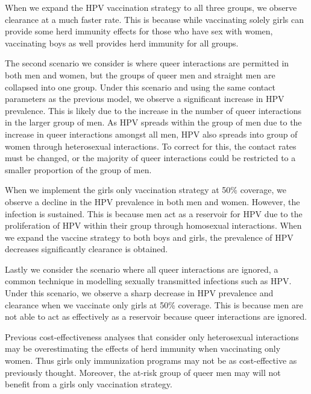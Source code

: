 \documentclass[12pt]{article}
\begin{document}
When we expand the HPV vaccination strategy to all three groups, we observe clearance at a much faster rate.  This is because while vaccinating solely girls can provide some herd immunity effects for those who have sex with women, vaccinating boys as well provides herd immunity for all groups.  

The second scenario we consider is where queer interactions are permitted in both men and women, but the groups of queer men and straight men are collapsed into one group.  Under this scenario and using the same contact parameters as the previous model, we observe a significant increase in HPV prevalence.  This is likely due to the increase in the number of queer interactions in the larger group of men.  As HPV spreads within the group of men due to the increase in queer interactions amongst all men, HPV also spreads into group of women through heterosexual interactions.  To correct for this, the contact rates must be changed, or the majority of queer interactions could be restricted to a smaller proportion of the group of men. 

When we implement the girls only vaccination strategy at 50\% coverage, we observe a decline in the HPV prevalence in both men and women.  However, the infection is sustained.  This is because men act as a reservoir for HPV due to the proliferation of HPV within their group through homosexual interactions.  When we expand the vaccine strategy to both boys and girls, the prevalence of HPV decreases significantly clearance is obtained. 

Lastly we consider the scenario where all queer interactions are ignored, a common technique in modelling sexually transmitted infections such as HPV.  Under this scenario, we observe a sharp decrease in HPV prevalence and clearance when we vaccinate only girls at 50\% coverage.  This is because men are not able to act as effectively as a reservoir because queer interactions are ignored.  

Previous cost-effectiveness analyses that consider only heterosexual interactions may be overestimating the effects of herd immunity when vaccinating only women.  Thus girls only immunization programs may not be as cost-effective as previously thought.  Moreover, the at-risk group of queer men may will not benefit from a girls only vaccination strategy.  
\end{document}
